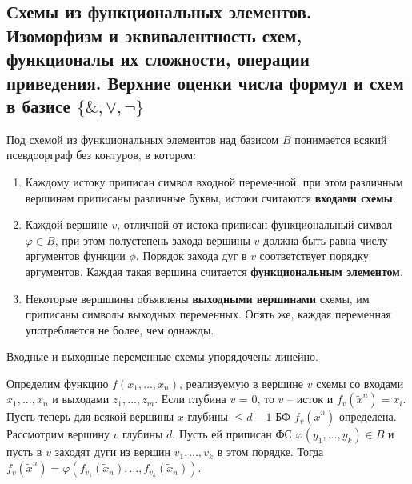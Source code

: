 \documentclass[11pt]{article}
\begin{document}
\subsection{Схемы из функциональных элементов. Изоморфизм и эквивалентность схем, функционалы их сложности, операции приведения. Верхние оценки числа формул и схем в базисе \(\{\&, \vee, \neg\}\)}
\label{sec:org8d19bff}
Под схемой из функциональных элементов над базисом \(B\) понимается всякий псевдоорграф без контуров, в котором:
\begin{enumerate}
\item Каждому истоку приписан символ входной переменной, при этом различным вершинам приписаны различные буквы, истоки считаются \textbf{входами схемы}.
\item Каждой вершине \(v\), отличной от истока приписан функциональный символ \(\varphi \in B\), при этом полустепень захода вершины \(v\) должна быть равна числу аргументов функции \(\phi\). Порядок захода дуг в \(v\) соответствует порядку аргументов. Каждая такая вершина считается \textbf{функциональным элементом}.
\item Некоторые вершшины объявлены \textbf{выходными вершинами} схемы, им приписаны символы выходных переменных. Опять же, каждая переменная употребляется не более, чем однажды.
\end{enumerate}
Входные и выходные переменные схемы упорядочены линейно.

Определим функцию \(f(x_1, \ldots, x_n)\), реализуемую в вершине \(v\) схемы со входами
\(x_1, \ldots, x_n\) и выходами \(z_1, \ldots, z_m\). Если глубина \(v\) = 0, то \(v\) -- исток и
\(f_v(\tilde{x}^n) = x_i\). Пусть теперь для всякой вершины \(x\) глубины \(\leq d - 1\) БФ
\(f_v(\tilde{x}^n)\) определена. Рассмотрим вершину \(v\) глубины \(d\). Пусть ей приписан ФС
\(\varphi(y_1, \ldots, y_k) \in B\) и пусть в \(v\) заходят дуги из вершин \(v_1, \ldots, v_k\)
в этом порядке. Тогда \(f_v(\tilde{x}^n) = \varphi(f_{v_1}(\tilde{x}_n), \ldots, f_{v_k}(\tilde{x}_n))\).
\end{document}
